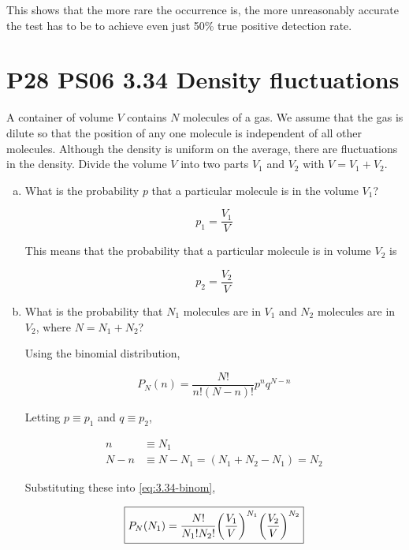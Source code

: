 \documentclass[9pt,a4paper,twocolumn]{article}
\begin{document}
This shows that the more rare the occurrence is, the more unreasonably accurate the test has to be to achieve even just 50\% true positive detection rate.

\section{P28 PS06 3.34 Density fluctuations}
A container of volume $V$ contains $N$ molecules of a gas. We assume that the gas is dilute so that the position of any one molecule is independent of all other molecules. Although the density is uniform on the average, there are fluctuations in the density. Divide the volume $V$ into two parts $V_1$ and $V_2$ with $V = V_1 + V_2$.

\begin{enumerate}[(a)]

\item What is the probability $p$ that a particular molecule is in the volume $V_1$?

\begin{equation}
	\boxed{
		p_1 = \frac{V_1}{V} \label{eq:3.34-v1}
	}
\end{equation}

This means that the probability that a particular molecule is in volume $V_2$ is

\begin{equation}
	p_2 = \frac{V_2}{V} \label{eq:3.34-v2}
\end{equation}

\item What is the probability that $N_1$ molecules are in $V_1$ and $N_2$ molecules are in $V_2$, where $N = N_1 + N_2$?

Using the binomial distribution,

\begin{equation}
	P_N(n) = \frac{N!}{n!(N-n)!} p^n q^{N-n} \label{eq:3.34-binom}
\end{equation}

Letting $p \equiv p_1$ and $q \equiv p_2$,

\begin{align}
	n &\equiv N_1 \\
	N - n &\equiv N - N_1 = (N_1 + N_2 - N_1) = N_2
\end{align}

Substituting these into \eqref{eq:3.34-binom},

\begin{equation}
	\boxed{
		P_N(N_1) = \frac{N!}{N_1!N_2!}\qty(\frac{V_1}{V})^{N_1} \qty(\frac{V_2}{V})^{N_2}
	} \label{eq:3.34-PN1}
\end{equation}


\end{enumerate}
\end{document}

